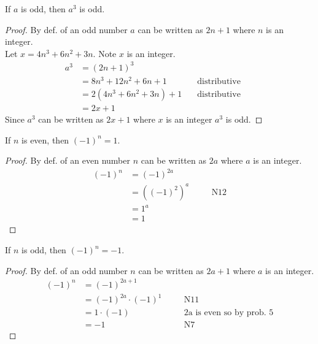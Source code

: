 \begin{tcolorbox}[title=Problem 4, breakable]
If $a$ is odd, then $a^3$ is odd.
\end{tcolorbox}

\begin{proof}
By def. of an odd number $a$ can be written as $2n + 1$ where $n$ is an integer. \\
Let $x = 4 n^3 + 6 n^2 + 3n$. Note $x$ is an integer. 
\begin{align*}
a^3 &= {(2n + 1)}^3 & \quad \text{} && \\
&= 8 n^3 + 12 n^2 + 6n + 1 & \quad \text{distributive} && \\
&= 2 (4 n^3 + 6 n^2 + 3n) + 1 & \quad \text{distributive} && \\
&= 2 x + 1 & \quad \text{}
\end{align*}
Since $a^3$ can be written as $2x + 1$ where $x$ is an integer $a^3$ is odd.
\end{proof}

\begin{tcolorbox}[title=Problem 5, breakable]
If $n$ is even, then ${(-1)}^n = 1$.
\end{tcolorbox}

\begin{proof}
By def. of an even number $n$ can be written as $2a$ where $a$ is an integer.
\begin{align*}
{(-1)}^n &= {(-1)}^{2a} && \\
&= {((-1)^2)}^{a} && \quad \text{N12} \\
&= {1}^{a} && \quad \text{} \\
&= 1
\end{align*}
\end{proof}

\begin{tcolorbox}[title=Problem 6, breakable]
If $n$ is odd, then ${(-1)}^n = -1$.
\end{tcolorbox}

\begin{proof}
By def. of an odd number $n$ can be written as $2a + 1$ where $a$ is an integer.
\begin{align*}
{(-1)}^n &= {(-1)}^{2a + 1} && \\
&= {(-1)}^{2a} \cdot {(-1)}^1 && \quad \text{N11} \\
&= 1 \cdot (-1) && \quad \text{2a is even so by prob. $5$} \\
&= -1 && \quad \text{N7}
\end{align*}
\end{proof}

